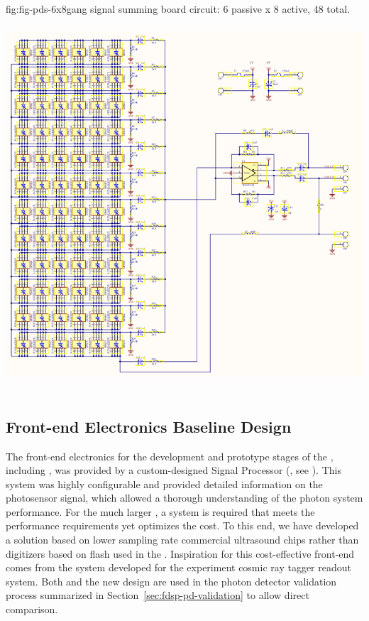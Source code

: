 \begin{dunefigure}
 {fig:fig-pds-6x8gang}
 { signal summing board circuit: 6 passive  x 8 active, 48  total.}
\includegraphics[height=14cm]{graphics/pds_gang_fig2.png}
\end{dunefigure}


\subsection{Front-end Electronics Baseline Design}
\label{sec:electronics}

The front-end electronics for the development and prototype stages of the  , including , was provided by a custom-designed  Signal Processor (, see ). This system was highly configurable and provided detailed information on the photosensor signal, which allowed a thorough understanding of the photon system performance.
For the much larger  , a system is required that meets the performance requirements yet optimizes the cost.
To this end, we have developed a solution based on lower sampling rate commercial ultrasound  chips rather than digitizers based on flash  used in the . Inspiration for this cost-effective front-end comes from the system developed for the  experiment cosmic ray tagger readout system.
Both  and the new design are used in the photon detector validation process summarized in Section~\ref{sec:fdsp-pd-validation} to allow direct comparison.

